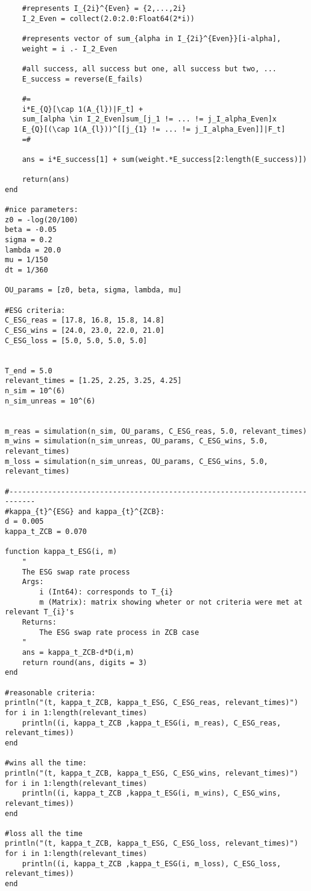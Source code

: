 \begin{verbatim}
    #represents I_{2i}^{Even} = {2,...,2i}
    I_2_Even = collect(2.0:2.0:Float64(2*i))

    #represents vector of sum_{alpha in I_{2i}^{Even}}[i-alpha], 
    weight = i .- I_2_Even

    #all success, all success but one, all success but two, ... 
    E_success = reverse(E_fails)
    
    #=
    i*E_{Q}[\cap 1(A_{l})|F_t] + 
    sum_[alpha \in I_2_Even]sum_[j_1 != ... != j_I_alpha_Even]x
    E_{Q}[(\cap 1(A_{l}))^[[j_{1} != ... != j_I_alpha_Even]]|F_t] 
    =#

    ans = i*E_success[1] + sum(weight.*E_success[2:length(E_success)])

    return(ans)
end

#nice parameters:
z0 = -log(20/100)
beta = -0.05
sigma = 0.2
lambda = 20.0
mu = 1/150
dt = 1/360

OU_params = [z0, beta, sigma, lambda, mu]

#ESG criteria:
C_ESG_reas = [17.8, 16.8, 15.8, 14.8]
C_ESG_wins = [24.0, 23.0, 22.0, 21.0]
C_ESG_loss = [5.0, 5.0, 5.0, 5.0]


T_end = 5.0
relevant_times = [1.25, 2.25, 3.25, 4.25]
n_sim = 10^(6)
n_sim_unreas = 10^(6)


m_reas = simulation(n_sim, OU_params, C_ESG_reas, 5.0, relevant_times)
m_wins = simulation(n_sim_unreas, OU_params, C_ESG_wins, 5.0, relevant_times)
m_loss = simulation(n_sim_unreas, OU_params, C_ESG_wins, 5.0, relevant_times)

#----------------------------------------------------------------------------
#kappa_{t}^{ESG} and kappa_{t}^{ZCB}: 
d = 0.005
kappa_t_ZCB = 0.070

function kappa_t_ESG(i, m)
    " 
    The ESG swap rate process 
    Args: 
        i (Int64): corresponds to T_{i}
        m (Matrix): matrix showing wheter or not criteria were met at relevant T_{i}'s
    Returns: 
        The ESG swap rate process in ZCB case 
    "
    ans = kappa_t_ZCB-d*D(i,m)
    return round(ans, digits = 3)
end

#reasonable criteria:
println("(t, kappa_t_ZCB, kappa_t_ESG, C_ESG_reas, relevant_times)")
for i in 1:length(relevant_times)
    println((i, kappa_t_ZCB ,kappa_t_ESG(i, m_reas), C_ESG_reas, relevant_times))
end

#wins all the time:
println("(t, kappa_t_ZCB, kappa_t_ESG, C_ESG_wins, relevant_times)")
for i in 1:length(relevant_times)
    println((i, kappa_t_ZCB ,kappa_t_ESG(i, m_wins), C_ESG_wins, relevant_times))
end

#loss all the time
println("(t, kappa_t_ZCB, kappa_t_ESG, C_ESG_loss, relevant_times)")
for i in 1:length(relevant_times)
    println((i, kappa_t_ZCB ,kappa_t_ESG(i, m_loss), C_ESG_loss, relevant_times))
end


\end{verbatim}


